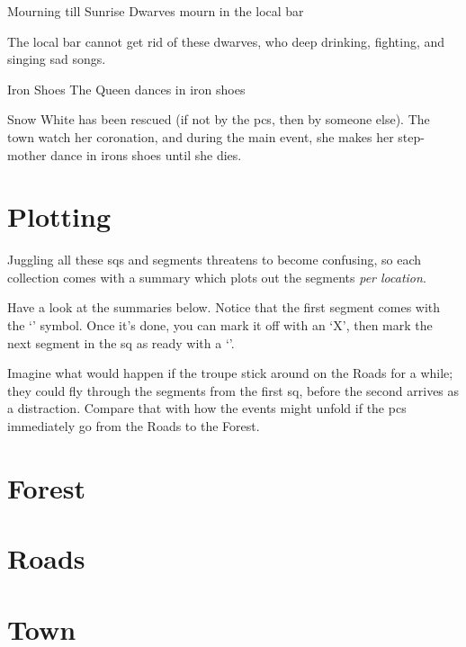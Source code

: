 \begin{multicols}{2}
{Mourning till Sunrise}%
{Dwarves mourn in the local bar}%

The local bar cannot get rid of these dwarves, who deep drinking, fighting, and singing sad songs. 

{Iron Shoes}%
{The Queen dances in iron shoes}%

Snow White has been rescued (if not by the \glspl{pc}, then by someone else).
The town watch her coronation, and during the main event, she makes her step-mother dance in irons shoes until she dies.

\end{multicols}

\section{Plotting }

\begin{multicols}{2}

\noindent
Juggling all these \glspl{sq} and \glspl{segment} threatens to become confusing, so each collection comes with a summary which plots out the \glspl{segment} \emph{per location}.

Have a look at the summaries below.
Notice that the first \gls{segment} comes with the `\sqr' symbol.
Once it's done, you can mark it off with an `X', then mark the next \gls{segment} in the \gls{sq} as ready with a `\sqr'.

Imagine what would happen if the troupe stick around on the Roads for a while; they could fly through the \glspl{segment} from the first \gls{sq}, before the second arrives as a distraction.
Compare that with how the events might unfold if the \glspl{pc} immediately go from the Roads to the Forest.

\end{multicols}

\section*{Forest }
\label{sideQuestSummaries}

\section*{Roads }

\section*{Town }

